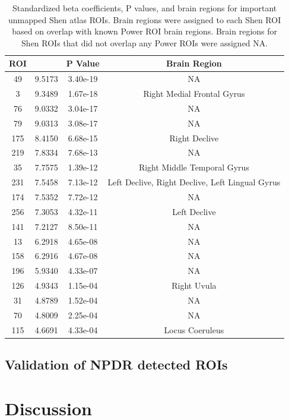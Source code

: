\documentclass[10pt,letterpaper]{article}\usepackage[]{graphicx}\usepackage[]{color}
\begin{document}
\begin{table}[h!]
	\centering
	\caption{Standardized beta coefficients, P values, and brain regions for important unmapped Shen atlas ROIs. Brain regions were assigned to each Shen ROI based on overlap with known Power ROI brain regions. Brain regions for Shen ROIs that did not overlap any Power ROIs were assigned NA.}\label{tab:unmapped-shen-tab}
\begin{tabular}[h!]{|c|c|c|c|}\hline
	\textbf{ROI} & \bm{$\beta_a$} & \textbf{P Value} & \textbf{Brain Region} \\ \hline
	49 & 9.5173 & 3.40e-19 & NA \\
	3 & 9.3489 & 1.67e-18 & Right Medial Frontal Gyrus \\
	76 & 9.0332 & 3.04e-17 & NA \\
	79 & 9.0313 & 3.08e-17 & NA \\
	175 & 8.4150 & 6.68e-15 & Right Declive \\
	219 & 7.8334 & 7.68e-13 & NA\\
	35 & 7.7575 & 1.39e-12 & Right Middle Temporal Gyrus\\
	231 & 7.5458 & 7.13e-12 & Left Declive, Right Declive, Left Lingual Gyrus\\
	174 & 7.5352 & 7.72e-12 & NA \\
	256 & 7.3053 & 4.32e-11 & Left Declive \\
	141 & 7.2127 & 8.50e-11 & NA \\
	13 & 6.2918 & 4.65e-08 & NA \\
	158 & 6.2916 & 4.67e-08 & NA \\
	196 & 5.9340 & 4.33e-07 & NA \\
	126 & 4.9343 & 1.15e-04 & Right Uvula\\
	31 & 4.8789 & 1.52e-04 & NA \\
	70 & 4.8009 & 2.25e-04 & NA \\
	115 & 4.6691 & 4.33e-04 & Locus Coeruleus \\ \hline
\end{tabular}
\end{table}

\subsection{Validation of NPDR detected ROIs}

\section{Discussion}


\end{document}
